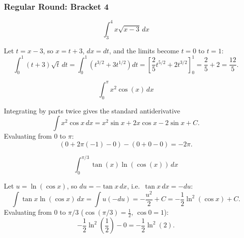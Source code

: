 \subsubsection*{Regular Round: Bracket 4}
\begin{questions}

\question \[\int_3^4 x\sqrt{x-3}\,dx\]
\begin{solution}
Let $t=x-3$, so $x=t+3$, $dx=dt$, and the limits become $t=0$ to $t=1$:
\[
\int_0^1 (t+3)\sqrt t\,dt=\int_0^1\left(t^{3/2}+3t^{1/2}\right)dt=\left[\frac25 t^{5/2}+2t^{3/2}\right]_0^1=\frac25+2=\frac{12}{5}.
\]
\end{solution}

\question \[\int_0^\pi x^2\cos(x)\,dx\]
\begin{solution}
Integrating by parts twice gives the standard antiderivative
\[
\int x^2\cos x\,dx=x^2\sin x+2x\cos x-2\sin x+C.
\]
Evaluating from $0$ to $\pi$:
\[
(0+2\pi(-1)-0)-(0+0-0)=-2\pi.
\]
\end{solution}

\question \[\int_0^{\pi/3} \tan(x)\ln(\cos(x))\,dx\]
\begin{solution}
Let $u=\ln(\cos x)$, so $du=-\tan x\,dx$, i.e.\ $\tan x\,dx=-du$:
\[
\int \tan x\ln(\cos x)\,dx=\int u(-du)=-\frac{u^2}{2}+C=-\frac12\ln^2(\cos x)+C.
\]
Evaluating from $0$ to $\pi/3$ ($\cos(\pi/3)=\tfrac12$, $\cos0=1$):
\[
-\frac12\ln^2\!\left(\frac12\right)-0=-\frac12\ln^2(2).
\]
\end{solution}

\end{questions}


